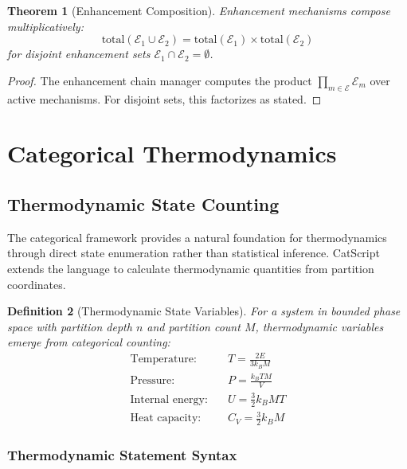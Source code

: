 \documentclass[twocolumn,10pt]{article}
\newtheorem{theorem}{Theorem}[section]
\newtheorem{definition}[theorem]{Definition}
\begin{document}
\begin{theorem}[Enhancement Composition]
Enhancement mechanisms compose multiplicatively:
\begin{equation}
    \text{total}(\mathcal{E}_1 \cup \mathcal{E}_2) = \text{total}(\mathcal{E}_1) \times \text{total}(\mathcal{E}_2)
\end{equation}
for disjoint enhancement sets $\mathcal{E}_1 \cap \mathcal{E}_2 = \emptyset$.
\end{theorem}

\begin{proof}
The enhancement chain manager computes the product $\prod_{m \in \mathcal{E}} \mathcal{E}_m$ over active mechanisms. For disjoint sets, this factorizes as stated.
\end{proof}

\section{Categorical Thermodynamics}
\label{sec:categorical_thermo}

\subsection{Thermodynamic State Counting}

The categorical framework provides a natural foundation for thermodynamics through direct state enumeration rather than statistical inference. CatScript extends the language to calculate thermodynamic quantities from partition coordinates.

\begin{definition}[Thermodynamic State Variables]
For a system in bounded phase space with partition depth $n$ and partition count $M$, thermodynamic variables emerge from categorical counting:
\begin{align}
\text{Temperature:} \quad &T = \frac{2E}{3k_B M} \\
\text{Pressure:} \quad &P = \frac{k_B T M}{V} \\
\text{Internal energy:} \quad &U = \frac{3}{2}k_B M T \\
\text{Heat capacity:} \quad &C_V = \frac{3}{2}k_B M
\end{align}
\end{definition}

\subsubsection{Thermodynamic Statement Syntax}
\end{document}
